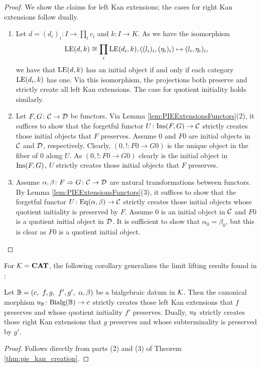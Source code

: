 \begin{proof} We show the claims for left Kan extensions; the cases for right Kan extensions follow dually.
   \begin{enumerate}

   \item Let $d = (d_i)_i\colon I\to \prod_i c_i$ and $k\colon I\to K$. As we have the isomorphism
   $$
   \mathrm{LE}(d,k)\cong\prod_i \mathrm{LE}(d_i,k), ((l_i)_i,(\eta_i)_i)\mapsto (l_i,\eta_i)_i,
   $$
   we have that $\mathrm{LE}(d,k)$ has an initial object if and only if each category $\mathrm{LE}(d_i,k)$ has one. Via this isomorphism, the projections both preserve and strictly create all left Kan extensions. The case for quotient initiality holds similarly.

    \item Let $F,G\colon \mathcal{C}\to \mathcal{D}$ be functors. Via Lemma \ref{lem:PIEExtensionsFunctors}(2), it suffices to show that the forgetful functor $U\colon \mathrm{Ins}(F,G)\to \mathcal{C}$ strictly creates those initial objects that $F$ preserves. Assume $0$ and $F0$ are initial objects in $\mathcal{C}$ and $\mathcal{D}$, respectively. Clearly, $(0, !\colon F0\to G0)$ is the unique object in the fiber of $0$ along $U$. As $(0,!\colon F0\to G0)$ clearly is the initial object in $\mathrm{Ins}(F,G)$, $U$ strictly creates those initial objects that $F$ preserves. 

       \item Assume $\alpha,\beta\colon F\Rightarrow G\colon \mathcal{C}\to \mathcal{D}$ are natural transformations between functors. By Lemma \ref{lem:PIEExtensionsFunctors}(3), it suffices to show that the forgetful functor $U\colon \mathrm{Eq}(\alpha,\beta)\to \mathcal{C}$ strictly creates those initial objects whose quotient initiality is preserved by $F$. Assume $0$ is an initial object in $\mathcal{C}$ and $F0$ is a quotient initial object in $\mathcal{D}$. It is sufficient to show that $\alpha_0 =\beta_0$, but this is clear as $F0$ is a quotient initial object. \qedhere
   \end{enumerate}
\end{proof}

For $\mathcal{K} = \mathbf{CAT}$, the following corollary generalizes the limit lifting results found in \cite[3.3, 3.4]{Ulmer1977Bialgebras}:
\begin{corollary}\label{cor:strictCreationToBialgebraicDatumObjectsKan}
    Let $\mathbb{B} = (c,\ f,g,\ f',g',\ \alpha,\beta)$ be a bialgebraic datum in $\mathcal{K}$. Then the canonical morphism $u_{\mathbb{B}}\colon \mathrm{Bialg}(\mathbb{B})\to c$ strictly creates those left Kan extensions that $f$ preserves and whose quotient initiality $f'$ preserves. Dually, $u_{\mathbb{B}}$ strictly creates those right Kan extensions that $g$ preserves and whose subterminality is preserved by $g'$. 
\end{corollary}
\begin{proof}
    Follows directly from parts (2) and (3) of Theorem \ref{thm:pie_kan_creation}.
\end{proof}


